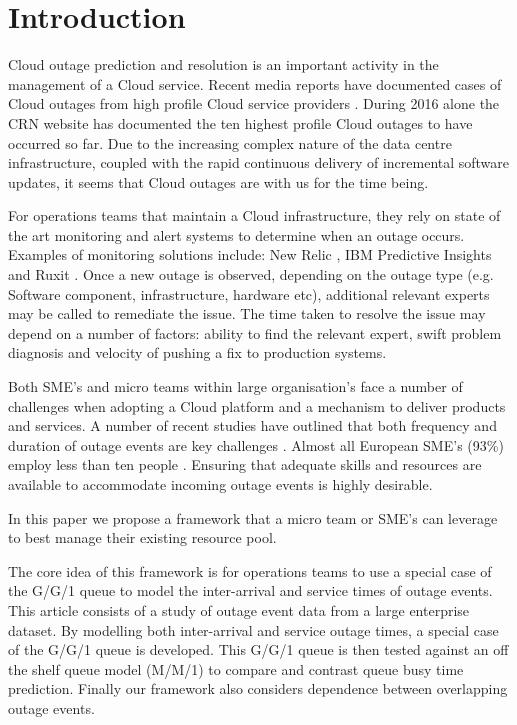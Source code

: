 \documentclass[5p]{elsarticle}
\begin{document}
\linenumbers

\section{Introduction}
Cloud outage prediction and resolution is an important activity in the management of a Cloud service. Recent media reports have documented cases of Cloud outages from high profile Cloud service providers \cite{CRN2016outage}. During 2016 alone the CRN website has documented the ten highest profile Cloud outages to have occurred so far.  Due to the increasing complex nature of the data centre infrastructure, coupled with the rapid continuous delivery of incremental software updates, it seems that Cloud outages are with us for the time being.


For operations teams that maintain a Cloud infrastructure, they rely on state of the art monitoring and alert systems to determine when an outage occurs. Examples of monitoring solutions include: New Relic \cite{newrelic}, IBM Predictive Insights \cite{predinsight} and Ruxit \cite{ruxit}. Once a new outage is observed, depending on the outage type (e.g. Software component, infrastructure, hardware etc), additional relevant experts may be called to remediate the issue. The time taken to resolve the issue may depend on a number of factors: ability to find the relevant expert, swift problem diagnosis and velocity of pushing a fix to production systems. 

Both SME's and micro teams within large organisation's face a number of challenges when adopting a Cloud platform and a mechanism to deliver products and services. A number of recent studies have outlined that both frequency and duration of outage events are key challenges \cite{InfoWorld2015outage}. Almost all European SME's (93\%) employ less than ten people \cite{europa2015sme}. Ensuring that adequate skills and resources are available to accommodate incoming outage events is highly desirable.

In this paper we propose a framework that a micro team or SME's can leverage to best manage their existing resource pool. 

The core idea of this framework is for operations teams to use a special case of the G/G/1 queue to model the inter-arrival and service times of outage events. This article consists of a study of outage event data from a large enterprise dataset. By modelling both inter-arrival and service outage times, a special case of the G/G/1 queue is developed. This G/G/1 queue is then tested against an off the shelf queue model (M/M/1) to compare and contrast queue busy time prediction. Finally our framework also considers dependence between overlapping outage events. 
\end{document}
